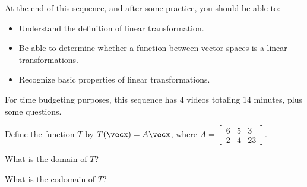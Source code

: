 




At the end of this sequence, and after some practice, you should be able to:

\begin{itemize}
\item Understand the definition of linear transformation.  
\item Be able to determine whether a function between vector spaces is a linear transformations. 
\item Recognize basic properties of linear transformations.
\end{itemize}

For time budgeting purposes, this sequence has 4 videos totaling 14 minutes, 
plus some questions.  



\endedxtext

\endedxvertical







Define the function $T$ by $T(\vecx) = A\vecx$, where $A = \left[ \begin{array}{ccc}
6 & 5 & 3 \\
2 & 4 &  23 
\end{array} \right].$

What is the domain of $T$?


What is the codomain of $T$?



\endedxproblem



